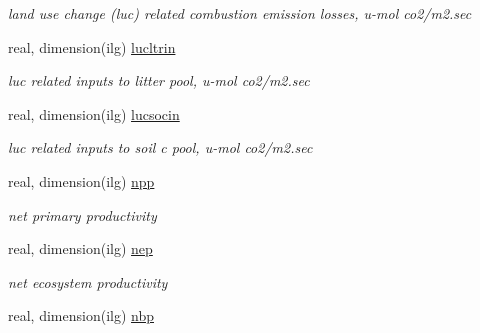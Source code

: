 \begin{DoxyCompactItemize}
\begin{DoxyCompactList}\small\item\em land use change (luc) related combustion emission losses, u-\/mol co2/m2.\+sec \end{DoxyCompactList}\item 
\hypertarget{structctem__statevars_1_1veg__gat_a317fb9e3375b467658b91da6beea18e6}{}real, dimension(ilg) \hyperlink{structctem__statevars_1_1veg__gat_a317fb9e3375b467658b91da6beea18e6}{lucltrin}\label{structctem__statevars_1_1veg__gat_a317fb9e3375b467658b91da6beea18e6}

\begin{DoxyCompactList}\small\item\em luc related inputs to litter pool, u-\/mol co2/m2.\+sec \end{DoxyCompactList}\item 
\hypertarget{structctem__statevars_1_1veg__gat_ac731c5b0110e0cef844f415b50404c07}{}real, dimension(ilg) \hyperlink{structctem__statevars_1_1veg__gat_ac731c5b0110e0cef844f415b50404c07}{lucsocin}\label{structctem__statevars_1_1veg__gat_ac731c5b0110e0cef844f415b50404c07}

\begin{DoxyCompactList}\small\item\em luc related inputs to soil c pool, u-\/mol co2/m2.\+sec \end{DoxyCompactList}\item 
\hypertarget{structctem__statevars_1_1veg__gat_af2ddb08c6bc3aaa6e1a12140b6a19d0f}{}real, dimension(ilg) \hyperlink{structctem__statevars_1_1veg__gat_af2ddb08c6bc3aaa6e1a12140b6a19d0f}{npp}\label{structctem__statevars_1_1veg__gat_af2ddb08c6bc3aaa6e1a12140b6a19d0f}

\begin{DoxyCompactList}\small\item\em net primary productivity \end{DoxyCompactList}\item 
\hypertarget{structctem__statevars_1_1veg__gat_af4d550e1f6458fd06b3e5a4214967b34}{}real, dimension(ilg) \hyperlink{structctem__statevars_1_1veg__gat_af4d550e1f6458fd06b3e5a4214967b34}{nep}\label{structctem__statevars_1_1veg__gat_af4d550e1f6458fd06b3e5a4214967b34}

\begin{DoxyCompactList}\small\item\em net ecosystem productivity \end{DoxyCompactList}\item 
\hypertarget{structctem__statevars_1_1veg__gat_a01a0355e2e4c7392eca6edeb4dddfccd}{}real, dimension(ilg) \hyperlink{structctem__statevars_1_1veg__gat_a01a0355e2e4c7392eca6edeb4dddfccd}{nbp}\label{structctem__statevars_1_1veg__gat_a01a0355e2e4c7392eca6edeb4dddfccd}


\end{DoxyCompactItemize}
